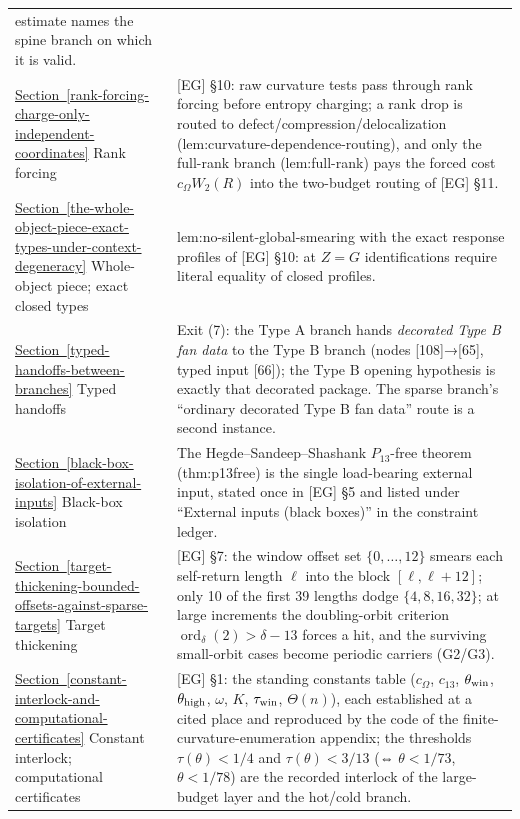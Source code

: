 \documentclass[
  11pt,
]{article}
\theoremstyle{definition}
\newcommand{\secref}[1]{\hyperref[#1]{Section~\ref*{#1}}}
\begin{document}
\begin{longtable}[]{@{}
  >{\raggedright\arraybackslash}p{}
  >{\raggedright\arraybackslash}p{}@{}}
estimate names the spine branch on which it is valid. \\
\secref{rank-forcing-charge-only-independent-coordinates} Rank forcing & {[}EG{]} §10: raw curvature tests pass through rank
forcing before entropy charging; a rank drop is routed to
defect/compression/delocalization (lem:curvature-dependence-routing),
and only the full-rank branch (lem:full-rank) pays the forced cost
\(c_\Omega W_2(R)\) into the two-budget routing of {[}EG{]} §11. \\
\secref{the-whole-object-piece-exact-types-under-context-degeneracy} Whole-object piece; exact closed types &
lem:no-silent-global-smearing with the exact response profiles of
{[}EG{]} §10: at \(Z=G\) identifications require literal equality of
closed profiles. \\
\secref{typed-handoffs-between-branches} Typed handoffs & Exit (7): the Type A branch hands \emph{decorated
Type B fan data} to the Type B branch (nodes {[}108{]}→{[}65{]}, typed
input {[}66{]}); the Type B opening hypothesis is exactly that decorated
package. The sparse branch's ``ordinary decorated Type B fan data''
route is a second instance. \\
\secref{black-box-isolation-of-external-inputs} Black-box isolation & The Hegde--Sandeep--Shashank \(P_{13}\)-free
theorem (thm:p13free) is the single load-bearing external input, stated
once in {[}EG{]} §5 and listed under ``External inputs (black boxes)''
in the constraint ledger. \\
\secref{target-thickening-bounded-offsets-against-sparse-targets} Target thickening & {[}EG{]} §7: the window offset set
\(\{0,\dots,12\}\) smears each self-return length \(\ell\) into the
block \([\ell,\ell+12]\); only 10 of the first 39 lengths dodge
\(\{4,8,16,32\}\); at large increments the doubling-orbit criterion
\(\operatorname{ord}_\delta(2)>\delta-13\) forces a hit, and the
surviving small-orbit cases become periodic carriers (G2/G3). \\
\secref{constant-interlock-and-computational-certificates} Constant interlock; computational certificates & {[}EG{]} §1: the
standing constants table (\(c_\Omega\), \(c_{13}\),
\(\theta_{\rm win}\), \(\theta_{\rm high}\), \(\omega\), \(K\),
\(\tau_{\rm win}\), \(\Theta(n)\)), each established at a cited place
and reproduced by the code of the finite-curvature-enumeration appendix;
the thresholds \(\tau(\theta)<1/4\) and \(\tau(\theta)<3/13\) (⇔
\(\theta<1/73\), \(\theta<1/78\)) are the recorded interlock of the
large-budget layer and the hot/cold branch. \\

\end{longtable}
\end{document}
